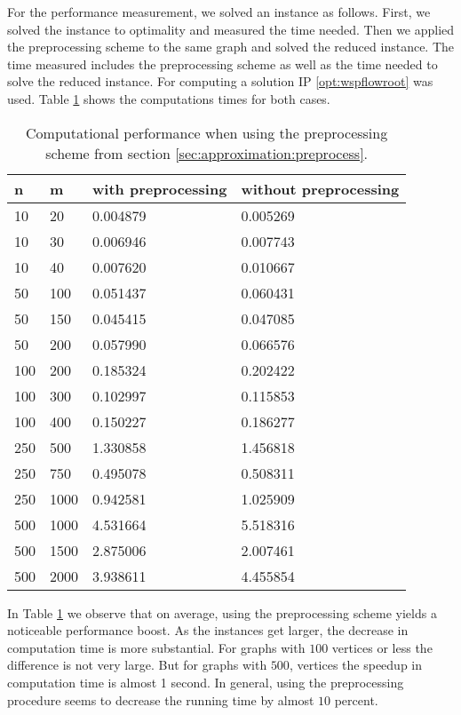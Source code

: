 For the performance measurement, we solved an instance as follows. First, we solved the instance to optimality and measured the time needed. Then we applied the preprocessing scheme to the same graph and solved the reduced instance. The time measured includes the preprocessing scheme as well as the time needed to solve the reduced instance. For computing a solution IP \eqref{opt:wspflowroot} was used. Table \ref{table:preprocess} shows the computations times for both cases.

\begin{table}[H]
	\centering
	\small
	\begin{tabular}{|l|l|l|l|}
		\hline
		n&m&with preprocessing&without preprocessing\\ \hline
		10&20&0.004879&0.005269\\ \hline
		10&30&0.006946&0.007743\\ \hline
		10&40&0.007620&0.010667\\ \hline
		50&100&0.051437&0.060431\\ \hline
		50&150&0.045415&0.047085\\ \hline
		50&200&0.057990&0.066576\\ \hline
		100&200&0.185324&0.202422\\ \hline
		100&300&0.102997&0.115853\\ \hline
		100&400&0.150227&0.186277\\ \hline			
		250&500&1.330858&1.456818\\ \hline
		250&750&0.495078&0.508311\\ \hline
		250&1000&0.942581&1.025909\\ \hline
		500&1000&4.531664&5.518316\\ \hline
		500&1500&2.875006&2.007461\\ \hline
		500&2000&3.938611&4.455854\\ \hline
	\end{tabular}
	\caption{Computational performance when using the preprocessing scheme from section \ref{sec:approximation:preprocess}.}
	\label{table:preprocess}
\end{table}

In Table \ref{table:preprocess} we observe that on average, using the preprocessing scheme yields a noticeable performance boost. As the instances get larger, the decrease in computation time is more substantial. For graphs with $100$ vertices or less the difference is not very large. But for graphs with $500$, vertices the speedup in computation time is almost 1 second. In general, using the preprocessing procedure seems to decrease the running time by almost $10$ percent.


